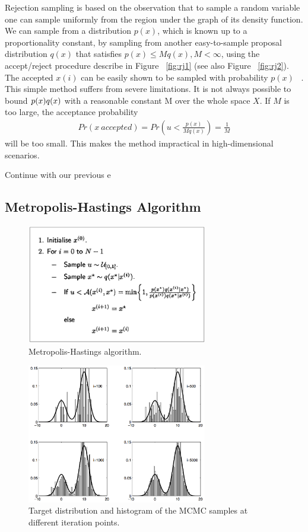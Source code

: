 Rejection sampling is based on the observation that to sample a random variable one can sample uniformly from the region under the graph of its density function. We can sample from a distribution $p(x)$, which is known up to a proportionality constant, by sampling from another easy-to-sample proposal distribution $q(x)$ that satisﬁes $p(x) \leq Mq(x), M < \infty$, using the accept/reject procedure describe in Figure ~\ref{fig:rj1} (see also Figure ~\ref{fig:rj2}). ~\cite{mcmc}
The accepted $x(i)$ can be easily shown to be sampled with probability $p(x)$ ~\cite{robert}. This simple method suffers from severe limitations. It is not always
possible to bound $p(x) \/ q(x)$ with a reasonable constant M over the whole space $X$. If $M$ is too large, the acceptance probability 
\begin{align*}
  Pr(x ~ accepted) = Pr(u < \frac{p(x)}{Mq(x)}) = \frac{1}{M}
\end{align*}
will be too small. This makes the method impractical in high-dimensional scenarios.

Continue with our previous e
\subsection{Metropolis-Hastings Algorithm}

\begin{figure}
    \centering
    \includegraphics[width=0.7\textwidth]{figures/mh.png}
    \caption{Metropolis-Hastings algorithm.}
    \label{fig:mh}
\end{figure}

\begin{figure}
    \centering
    \includegraphics[width=0.7\textwidth]{figures/mh2.png}
    \caption{Target distribution and histogram of the MCMC samples at different iteration points.}
    \label{fig:mh2}
\end{figure}


